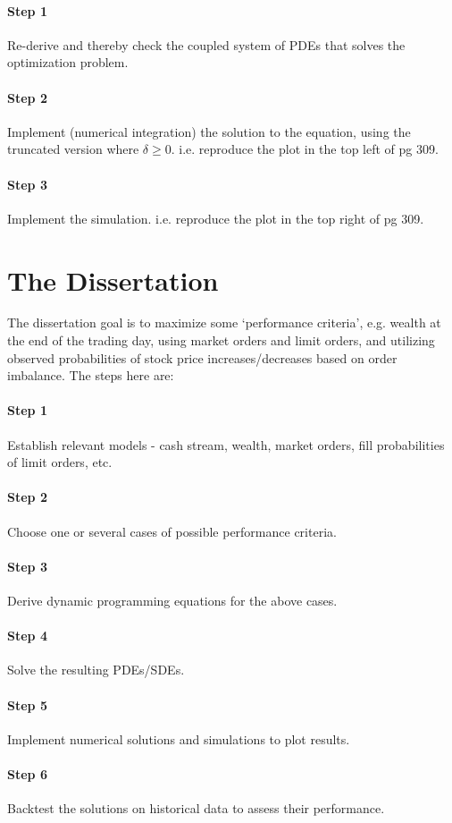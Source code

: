 \documentclass[12pt]{article}
\begin{document}
\paragraph{Step 1} Re-derive and thereby check the coupled system of PDEs that solves the optimization problem.
\paragraph{Step 2} Implement (numerical integration) the solution to the equation, using the truncated version where $\delta \geq 0$. i.e. reproduce the plot in the top left of pg 309.
\paragraph{Step 3} Implement the simulation. i.e. reproduce the plot in the top right of pg 309.

\section*{The Dissertation}
The dissertation goal is to maximize some `performance criteria', e.g. wealth at the end of the trading day, using market orders and limit orders, and utilizing observed probabilities of stock price increases/decreases based on order imbalance. The steps here are:
\paragraph{Step 1} Establish relevant models - cash stream, wealth, market orders, fill probabilities of limit orders, etc.
\paragraph{Step 2} Choose one or several cases of possible performance criteria.
\paragraph{Step 3} Derive dynamic programming equations for the above cases.
\paragraph{Step 4} Solve the resulting PDEs/SDEs.
\paragraph{Step 5} Implement numerical solutions and simulations to plot results.
\paragraph{Step 6} Backtest the solutions on historical data to assess their performance.
\end{document}
